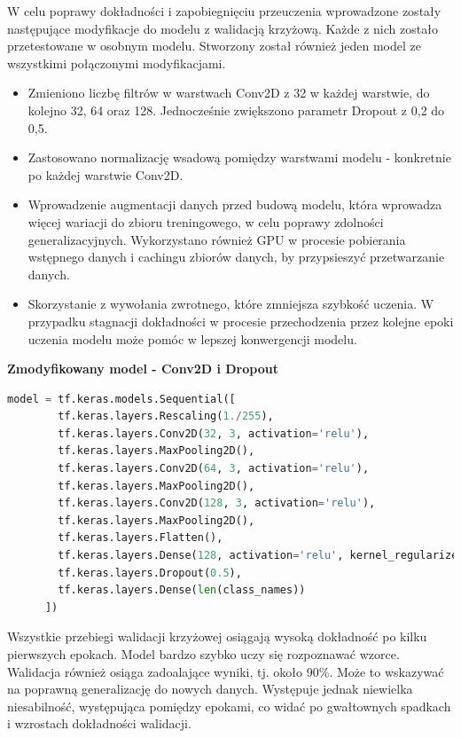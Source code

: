 W celu poprawy dokładności i zapobiegnięciu przeuczenia wprowadzone
zostały następujące modyfikacje do modelu z walidacją krzyżową.
Każde z nich zostało przetestowane w osobnym modelu.
Stworzony został również jeden model ze wszystkimi połączonymi modyfikacjami. 
\begin{itemize}[label=-,labelsep=0.4cm,leftmargin=0.6cm]
    \item Zmieniono liczbę filtrów w warstwach Conv2D z 32 w każdej warstwie, do kolejno 32, 64 oraz 128.
		Jednocześnie zwiększono parametr Dropout z 0,2 do 0,5.
    \item Zastosowano normalizację wsadową pomiędzy warstwami modelu - konkretnie po każdej warstwie Conv2D.
    \item Wprowadzenie augmentacji danych przed budową modelu, która wprowadza więcej wariacji do zbioru treningowego,
		w celu poprawy zdolności generalizacyjnych.
		Wykorzystano również GPU w procesie pobierania wstępnego danych i cachingu zbiorów danych, by przypsieszyć przetwarzanie danych.
	\item Skorzystanie z wywołania zwrotnego, które zmniejsza szybkość uczenia.
		W przypadku stagnacji dokładności w procesie przechodzenia przez kolejne epoki uczenia modelu
		może pomóc w lepszej konwergencji modelu.
\end{itemize}

\textbf{Zmodyfikowany model - Conv2D i Dropout}

\begin{lstlisting}[language=Python,caption=Listing zmodyfikowanego skryptu tworzącego model z walidacją krzyżową - wersja 1,
	label={tests-model-crossval1}]
	model = tf.keras.models.Sequential([
		tf.keras.layers.Rescaling(1./255),
		tf.keras.layers.Conv2D(32, 3, activation='relu'),
		tf.keras.layers.MaxPooling2D(),
		tf.keras.layers.Conv2D(64, 3, activation='relu'),
		tf.keras.layers.MaxPooling2D(),
		tf.keras.layers.Conv2D(128, 3, activation='relu'),
		tf.keras.layers.MaxPooling2D(),
		tf.keras.layers.Flatten(),
		tf.keras.layers.Dense(128, activation='relu', kernel_regularizer=tf.keras.regularizers.l2(0.01)),
		tf.keras.layers.Dropout(0.5),
		tf.keras.layers.Dense(len(class_names))
	  ])
\end{lstlisting}

Wszystkie przebiegi walidacji krzyżowej osiągają wysoką dokładność po kilku pierwszych epokach.
Model bardzo szybko uczy się rozpoznawać wzorce.
Walidacja również osiąga zadoalające wyniki, tj. około 90\%. Może to wskazywać na poprawną generalizację do nowych danych.
Występuje jednak niewielka niesabilność, występująca pomiędzy epokami,
co widać po gwałtownych spadkach i wzrostach dokładności walidacji.

